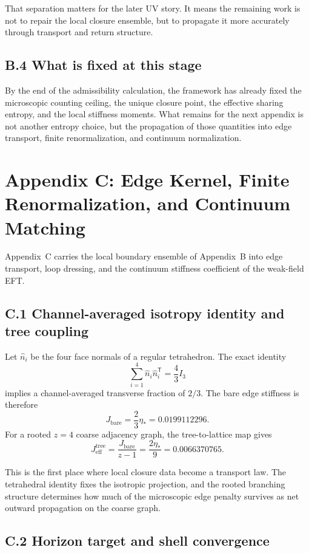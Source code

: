 \documentclass[11pt]{article}
\begin{document}
That separation matters for the later UV story. It means the remaining work is not to repair the local closure ensemble, but to propagate it more accurately through transport and return structure.

\subsection*{B.4 What is fixed at this stage}

By the end of the admissibility calculation, the framework has already fixed the microscopic counting ceiling, the unique closure point, the effective sharing entropy, and the local stiffness moments. What remains for the next appendix is not another entropy choice, but the propagation of those quantities into edge transport, finite renormalization, and continuum normalization.

\section*{Appendix C: Edge Kernel, Finite Renormalization, and Continuum Matching}

Appendix~C carries the local boundary ensemble of Appendix~B into edge transport, loop dressing, and the continuum stiffness coefficient of the weak-field EFT.

\subsection*{C.1 Channel-averaged isotropy identity and tree coupling}

Let $\hat n_i$ be the four face normals of a regular tetrahedron. The exact identity
\[
\sum_{i=1}^4 \hat n_i\hat n_i^{\mathsf T}=\frac{4}{3}I_3
\]
implies a channel-averaged transverse fraction of $2/3$. The bare edge stiffness is therefore
\[
J_{\mathrm{bare}}=\frac{2}{3}\eta_*=0.0199112296.
\]
For a rooted $z=4$ coarse adjacency graph, the tree-to-lattice map gives
\[
J_{\mathrm{eff}}^{\mathrm{tree}}=\frac{J_{\mathrm{bare}}}{z-1}=\frac{2\eta_*}{9}=0.0066370765.
\]

This is the first place where local closure data become a transport law. The tetrahedral identity fixes the isotropic projection, and the rooted branching structure determines how much of the microscopic edge penalty survives as net outward propagation on the coarse graph.

\subsection*{C.2 Horizon target and shell convergence}
\end{document}
